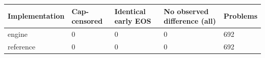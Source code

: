 \begin{tabular}{lllll}
\toprule
Implementation & Cap-censored & Identical early EOS & No observed difference (all) & Problems \\
\midrule
engine & 0 & 0 & 0 & 692 \\
reference & 0 & 0 & 0 & 692 \\
\bottomrule
\end{tabular}
